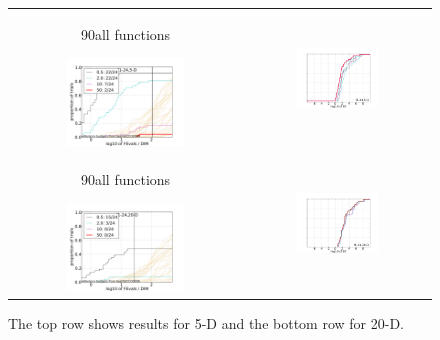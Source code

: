 \documentclass{article}
\newcommand{\rot}[2][2.5]{
  \hspace*{-3.5\baselineskip}%
  \begin{rotate}{90}\hspace{#1em}#2
  \end{rotate}}
\begin{document}
\begin{figure}[htbp!]
\centering
\begin{tabular}{@{}c@{}c@{}}
\rot[5]{all functions}\includegraphics[width=0.528\textwidth,trim=0 0mm 16mm 11mm, clip]{pprldistr_05D_noiselessall} &
\includegraphics[width=0.46\textwidth,trim=24mm 0mm 16mm 11mm, clip]{ppfvdistr_05D_noiselessall}\\
\rot[5]{all functions}\includegraphics[width=0.528\textwidth,trim=0 0mm 16mm 11mm, clip]{pprldistr_20D_noiselessall} &
\includegraphics[width=0.46\textwidth,trim=24mm 0mm 16mm 11mm, clip]{ppfvdistr_20D_noiselessall}
\end{tabular}
\caption{\label{fig:RLDs05Da\algfolder} \bbobpprldistrlegend{} The top row shows results for 5-D and the bottom row for 20-D.}
\end{figure}
\end{document}
